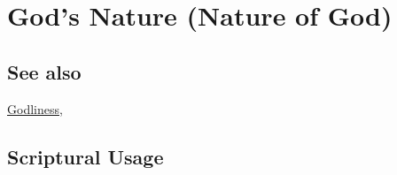\section{God's Nature (Nature of God)}
	\label{GODSNATURE}
	
\subsection{See also}

	\hyperref[GODLINESS]{Godliness},




	


\subsection{Scriptural Usage} %
	\label{GODSNATURE-SCRIPTURES}

